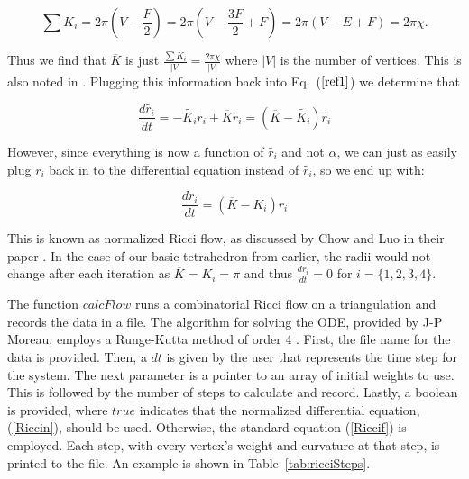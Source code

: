 \documentclass[12pt]{article}
\begin{document}
$$\sum{K_i} = 2\pi(V - \frac{F}{2}) = 2\pi(V - \frac{3F}{2} + F) = 2\pi(V - E + F) = 2\pi \chi.$$

\noindent Thus we find that $\overline{K}$ is just $\displaystyle\frac{\sum{K_i}}{|V|} = \frac{2\pi \chi}{|V|}$ where $|V|$ is the number of vertices. This is also noted in \cite{chowluo}. Plugging this information back into Eq.~($\ref{ref1}$) we determine that

\begin{equation}
\frac{d\tilde{r_i}}{dt} = -\tilde{K_i}\tilde{r_i} + \overline{K}\tilde{r_i} = (\overline{K} - \tilde{K_i})\tilde{r_i}
\end{equation}

\noindent However, since everything is now a function of $\tilde{r_i}$ and not $\alpha$, we can just as easily plug $r_i$ back in to the differential equation instead of $\tilde{r_i}$, so we end up with:

\begin{equation}
\label{Riccin}
\frac{dr_i}{dt} = (\overline{K} - K_i)r_i
\end{equation}

\noindent This is known as normalized Ricci flow, as discussed by Chow and Luo in their paper \cite{chowluo}. In the case of our basic tetrahedron from earlier, the radii would not change after each iteration as $\overline{K} = K_i = \pi$ and thus $\displaystyle\frac{dr_i}{dt} = 0$ for $i = \{1,2,3,4\}$. 

\noindent The function $calcFlow$ runs a combinatorial Ricci flow on a triangulation and records the data in a file. The algorithm for solving the ODE, provided by J-P Moreau, employs a Runge-Kutta method of order 4 \cite{JPM}. First, the file name for the data is provided. Then, a $dt$ is given by the user that represents the time step for the system. The next parameter is a pointer to an array of initial weights to use. This is followed by the number of steps to calculate and record. Lastly, a boolean is provided, where $true$ indicates that the normalized differential equation, (\ref{Riccin}), should be used. Otherwise, the standard equation (\ref{Riccif}) is employed. Each step, with every vertex's weight and curvature at that step, is printed to the file. An example is shown in Table~\ref{tab:ricciSteps}.\newline
\end{document}
